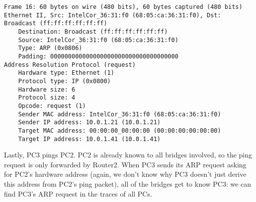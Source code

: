 \begin{lstlisting}
Frame 16: 60 bytes on wire (480 bits), 60 bytes captured (480 bits)
Ethernet II, Src: IntelCor_36:31:f0 (68:05:ca:36:31:f0), Dst: Broadcast (ff:ff:ff:ff:ff:ff)
    Destination: Broadcast (ff:ff:ff:ff:ff:ff)
    Source: IntelCor_36:31:f0 (68:05:ca:36:31:f0)
    Type: ARP (0x0806)
    Padding: 000000000000000000000000000000000000
Address Resolution Protocol (request)
    Hardware type: Ethernet (1)
    Protocol type: IP (0x0800)
    Hardware size: 6
    Protocol size: 4
    Opcode: request (1)
    Sender MAC address: IntelCor_36:31:f0 (68:05:ca:36:31:f0)
    Sender IP address: 10.0.1.21 (10.0.1.21)
    Target MAC address: 00:00:00_00:00:00 (00:00:00:00:00:00)
    Target IP address: 10.0.1.41 (10.0.1.41)
\end{lstlisting}
Lastly, PC3 pings PC2. PC2 is already known to all bridges involved, so the ping request is only
forwarded by Router2. When PC3 sends its ARP request asking for PC2's hardware address (again,
we don't know why PC3 doesn't just derive this address from PC2's ping packet), all of the bridges
get to know PC3: we can find PC3's ARP request in the traces of all PCs. 